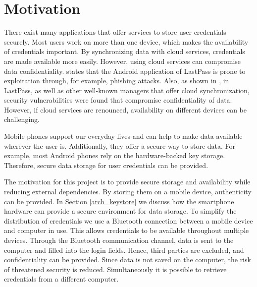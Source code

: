 \section{Motivation} \label{motivation}
There exist many applications that offer services to store user credentials securely. Most users work on more than one device, which makes the availability of credentials important.
By synchronizing data with cloud services, credentials are made available more easily. However, using cloud services can compromise data confidentiality. \cite{AndroidPhishing} states that the Android application of LastPass is prone to exploitation through, for example, phishing attacks. Also, as shown in \cite{PMLeak}, in LastPass, as well as other well-known managers that offer cloud synchronization, security vulnerabilities were found that compromise confidentiality of data. However, if cloud services are renounced, availability on different devices can be challenging.

Mobile phones support our everyday lives and can help to make data available wherever the user is. Additionally, they offer a secure way to store data. For example, most Android phones rely on the hardware-backed key storage. Therefore, secure data storage for user credentials can be provided. 

The motivation for this project is to provide secure storage and availability while reducing external dependencies. By storing them on a mobile device, authenticity can be provided. In Section \ref{arch_keystore} we discuss how the smartphone hardware can provide a secure environment for data storage. To simplify the distribution of credentials we use a Bluetooth connection between a mobile device and computer in use. This allows credentials to be available throughout multiple devices. Through the Bluetooth communication channel, data is sent to the computer and filled into the login fields. Hence, third parties are excluded, and confidentiality can be provided. Since data is not saved on the computer, the risk of threatened security is reduced. Simultaneously it is possible to retrieve credentials from a different computer. 

